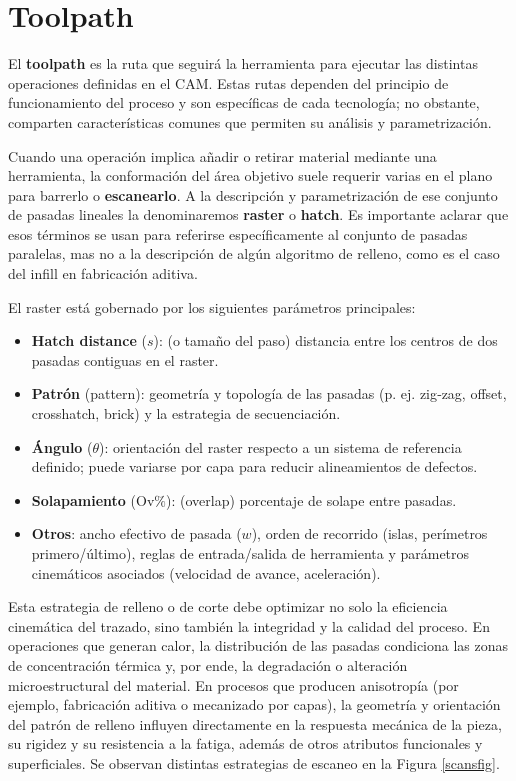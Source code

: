 \section{Toolpath}

El \textbf{toolpath} es la ruta que seguirá la herramienta para ejecutar las distintas operaciones definidas en el CAM. Estas rutas dependen del principio de funcionamiento del proceso y son específicas de cada tecnología; no obstante, comparten características comunes que permiten su análisis y parametrización. 

Cuando una operación implica añadir o retirar material mediante una herramienta, la conformación del área objetivo suele requerir varias  en el plano para barrerlo o \textbf{escanearlo}. A la descripción y parametrización de ese conjunto de pasadas lineales la denominaremos \textbf{raster} o \textbf{hatch}. Es importante aclarar que esos términos se usan para referirse específicamente al conjunto de pasadas paralelas, mas no a la descripción de algún algoritmo de relleno, como es el caso del infill en fabricación aditiva.

El raster está gobernado por los siguientes parámetros principales:

\begin{itemize}
	\item \textbf{Hatch distance} (\(s\)): (o tamaño del paso) distancia entre los centros de dos pasadas contiguas en el raster.
	\item \textbf{Patrón} (pattern): geometría y topología de las pasadas (p. ej. zig‑zag, offset, crosshatch, brick) y la estrategia de secuenciación.
	\item \textbf{Ángulo} (\(\theta\)): orientación del raster respecto a un sistema de referencia definido; puede variarse por capa para reducir alineamientos de defectos.
	\item \textbf{Solapamiento} (Ov$\%$): (overlap) porcentaje de solape entre pasadas.
	\item \textbf{Otros}: ancho efectivo de pasada (\(w\)), orden de recorrido (islas, perímetros primero/último), reglas de entrada/salida de herramienta y parámetros cinemáticos asociados (velocidad de avance, aceleración).
\end{itemize}

Esta estrategia de relleno o de corte debe optimizar no solo la eficiencia cinemática del trazado, sino también la integridad y la calidad del proceso. En operaciones que generan calor, la distribución de las pasadas condiciona las zonas de concentración térmica y, por ende, la degradación o alteración microestructural del material. En procesos que producen anisotropía (por ejemplo, fabricación aditiva o mecanizado por capas), la geometría y orientación del patrón de relleno influyen directamente en la respuesta mecánica de la pieza, su rigidez y su resistencia a la fatiga, además de otros atributos funcionales y superficiales. Se observan distintas estrategias de escaneo en la Figura \ref{scansfig}.

